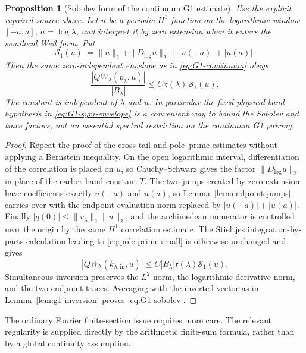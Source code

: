 \documentclass[11pt]{article}
\newtheorem{proposition}[theorem]{Proposition}
\theoremstyle{remark}
\begin{document}
\begin{proposition}[Sobolev form of the continuum G1 estimate]\label{prop:g1-sobolev}
Use the explicit repaired source above. Let $u$ be a periodic $H^1$ function on the logarithmic window $[-a,a]$,
$a=\log\lambda$, and interpret it by zero extension when it enters the
semilocal Weil form.  Put
\[
 \mathcal S_1(u):=\|u\|_2+\|D_{\log}u\|_2
 +|u(-a)|+|u(a)|.
\]
Then the same zero-independent envelope as in \eqref{eq:G1-continuum} obeys
\begin{equation}\label{eq:G1-sobolev}
 \boxed{
 \frac{|QW_\lambda(p_\lambda,u)|}{|B_\lambda|}
 \le C\,\mathfrak r(\lambda)\,\mathcal S_1(u).}
\end{equation}
The constant is independent of $\lambda$ and $u$.  In particular the
fixed-physical-band hypothesis in \eqref{eq:G1-sym-envelope} is a convenient
way to bound the Sobolev and trace factors, not an essential spectral
restriction on the continuum G1 pairing.
\end{proposition}
\begin{proof}
Repeat the proof of the cross-tail and pole--prime estimates without applying
a Bernstein inequality.  On the open logarithmic interval, differentiation
of the correlation is placed on $u$, so Cauchy--Schwarz gives the factor
$\|D_{\log}u\|_2$ in place of the earlier band constant $T$.  The two jumps
created by zero extension have coefficients exactly $u(-a)$ and $u(a)$, so
Lemma~\ref{lem:endpoint-jumps} carries over with the endpoint-evaluation norm
replaced by $|u(-a)|+|u(a)|$.  Finally
$|q(0)|\le\|r_\lambda\|_2\|u\|_2$, and the archimedean numerator is
controlled near the origin by the same $H^1$ correlation estimate.  The
Stieltjes integration-by-parts calculation leading to
\eqref{eq:pole-prime-small} is otherwise unchanged and gives
\[
 |QW_\lambda(k_{\lambda,\mathrm{in}},u)|
 \le C|B_\lambda|\mathfrak r(\lambda)\mathcal S_1(u).
\]
Simultaneous inversion preserves the $L^2$ norm, the logarithmic derivative
norm, and the two endpoint traces.  Averaging with the inverted vector as in
Lemma~\ref{lem:g1-inversion} proves \eqref{eq:G1-sobolev}.
\end{proof}

The ordinary Fourier finite-section issue requires more care.  The relevant regularity is supplied directly by the arithmetic finite-sum formula, rather than by a global continuity assumption.
\end{document}
